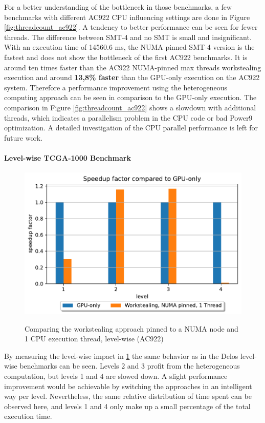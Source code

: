 For a better understanding of the bottleneck in those benchmarks, a few benchmarks with different AC922 CPU influencing settings are done in Figure \ref{fig:threadcount_ac922}. A tendency to better performance can be seen for fewer threads. The difference between SMT-4 and no SMT is small and insignificant. With an execution time of 14560.6 ms, the NUMA pinned SMT-4 version is the fastest and does not show the bottleneck of the first AC922 benchmarks. It is around ten times faster than the AC922 NUMA-pinned max threads workstealing execution and around \textbf{13,8\% faster} than the GPU-only execution on the AC922 system. Therefore a performance improvement using the heterogeneous computing approach can be seen in comparison to the GPU-only execution. The comparison in Figure \ref{fig:threadcount_ac922} shows a slowdown with additional threads, which indicates a parallelism problem in the CPU code or bad Power9 optimization. A detailed investigation of the CPU parallel performance is left for future work.

\paragraph{Level-wise TCGA-1000 Benchmark}
\begin{figure}[H]
  \caption{Comparing the workstealing approach pinned to a NUMA node and 1 CPU execution thread, level-wise (AC922)}
  \includegraphics[width=\textwidth]{figures/ac922_levelwise.pdf}
  \centering
  \label{fig:levelwise_ac922}
\end{figure}

By measuring the level-wise impact in \ref{fig:levelwise_ac922} the same behavior as in the Delos level-wise benchmarks can be seen. Levels 2 and 3 profit from the heterogeneous computation, but levels 1 and 4 are slowed down. A slight performance improvement would be achievable by switching the approaches in an intelligent way per level. Nevertheless, the same relative distribution of time spent can be observed here, and levels 1 and 4 only make up a small percentage of the total execution time.

